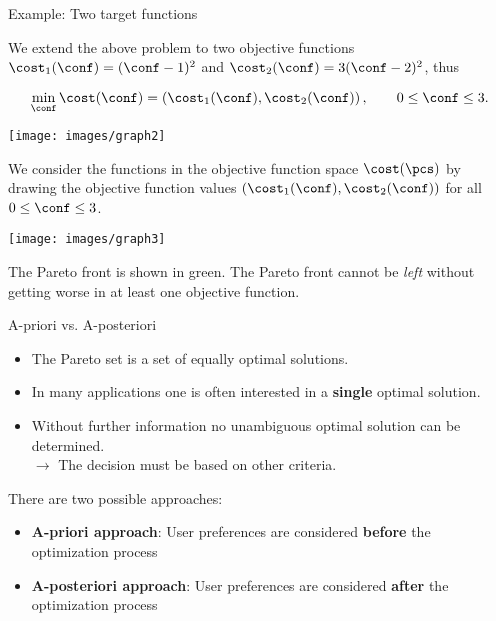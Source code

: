 \begin{frame}[allowframebreaks]{Example: Two target functions}

We extend the above problem to two objective functions $\cost_1(\conf) = (\conf - 1)^2$ and $\cost_2(\conf) = 3(\conf - 2)^2$, thus

$$
    \min_{\conf} \cost(\conf) = \left(\cost_1(\conf), \cost_2(\conf)\right), \qquad 0 \le \conf \le 3.
$$

    \begin{center}
    \texttt{[image: images/graph2]}
    \end{center}

\framebreak

We consider the functions in the objective function space $\cost(\pcs)$ by drawing the objective function values $\left(\cost_1(\conf), \cost_2(\conf)\right)$ for all $0 \le \conf \le 3$.

\vspace*{0.1cm}


    \begin{center}
    \texttt{[image: images/graph3]}
    \end{center}
    \vspace*{-0.3cm}

The Pareto front is shown in green.
    The Pareto front cannot be \emph{left} without getting worse in at least one objective function.

\end{frame}


\begin{frame}{A-priori vs. A-posteriori}

\begin{itemize}
\item The Pareto set is a set of equally optimal solutions.
\item In many applications one is often interested in a \textbf{single} optimal solution.
\item Without further information no unambiguous optimal solution can be determined. \\
$\to$ The decision must be based on other criteria.
\end{itemize}

    \vspace{0.5cm}

There are two possible approaches:
\begin{itemize}
\item \textbf{A-priori approach}: User preferences are considered \textbf{before} the optimization process
\item \textbf{A-posteriori approach}: User preferences are considered \textbf{after} the optimization process
\end{itemize}

\end{frame}

